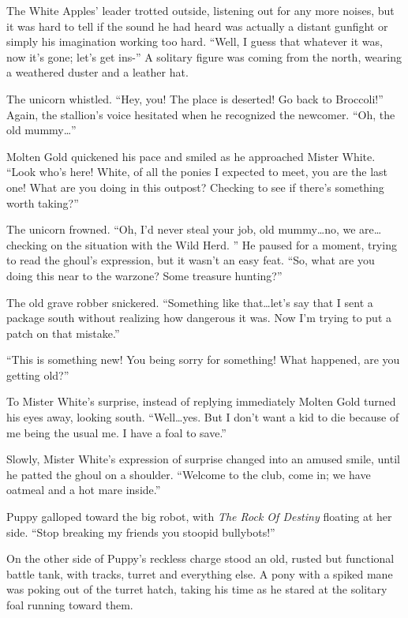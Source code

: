 The White Apples' leader trotted outside, listening out for any more noises, but it was hard to tell if the sound he had heard was actually a distant gunfight or simply his imagination working too hard. ``Well, I guess that whatever it was, now it's gone; let's get ins-'' A solitary figure was coming from the north, wearing a weathered duster and a leather hat.

The unicorn whistled. ``Hey, you! The place is deserted! Go back to Broccoli!'' Again, the stallion's voice hesitated when he recognized the newcomer. ``Oh, the old mummy\dots''

Molten Gold quickened his pace and smiled as he approached Mister White. ``Look who's here! White, of all the ponies I expected to meet, you are the last one! What are you doing in this outpost? Checking to see if there's something worth taking?''

The unicorn frowned. ``Oh, I'd never steal your job, old mummy\dots no, we are\dots checking on the situation with the Wild Herd. '' He paused for a moment, trying to read the ghoul's expression, but it wasn't an easy feat. ``So, what are you doing this near to the warzone? Some treasure hunting?''

The old grave robber snickered. ``Something like that\dots let's say that I sent a package south without realizing how dangerous it was. Now I'm trying to put a patch on that mistake.''

``This is something new! You being sorry for something! What happened, are you getting old?''

To Mister White's surprise, instead of replying immediately Molten Gold turned his eyes away, looking south. ``Well\dots yes. But I don't want a kid to die because of me being the usual me. I have a foal to save.''

Slowly, Mister White's expression of surprise changed into an amused smile, until he patted the ghoul on a shoulder. ``Welcome to the club, come in; we have oatmeal and a hot mare inside.''

\horizonline


Puppy galloped toward the big robot, with \emph{The Rock Of Destiny} floating at her side. ``Stop breaking my friends you stoopid bullybots!''

On the other side of Puppy's reckless charge stood an old, rusted but functional battle tank, with tracks, turret and everything else. A pony with a spiked mane was poking out of the turret hatch, taking his time as he stared at the solitary foal running toward them.

